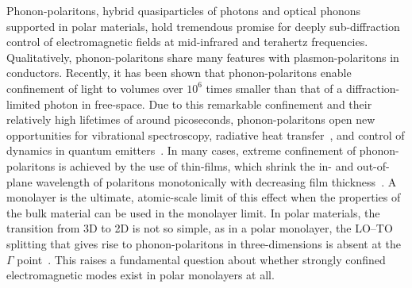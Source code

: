 \documentclass[aps,prb,twocolumn,
	           groupedaddress,superscriptaddress,
               amsfonts,amssymb,amsmath,floatfix,
	           citeautoscript]{revtex4-1}
\begin{document}
Phonon-polaritons, hybrid quasiparticles of photons and optical phonons supported in polar materials, hold tremendous promise for deeply sub-diffraction control of electromagnetic fields at mid-infrared and terahertz frequencies. Qualitatively, phonon-polaritons share many features with plasmon-polaritons in conductors. Recently, it has been shown that phonon-polaritons enable confinement of light to volumes over $10^6$ times smaller than that of a diffraction-limited photon in free-space\cite{caldwell2013low,xu2014mid,caldwell2014sub,dai2014tunable,tomadin2015accessing,yoxall2015direct,li2015hyperbolic,dai2015subdiffractional,dai2015graphene,caldwell2015low,li2016reversible,Basov:2016,basov2017towards,low2017polaritons,giles2017ultra,li2018infrared,ma2018plane}. Due to this remarkable confinement and their relatively high lifetimes of around picoseconds, phonon-polaritons open new opportunities for vibrational spectroscopy,\cite{autore2018boron} radiative heat transfer~\cite{hillenbrand2002phonon}, and control of dynamics in quantum emitters~\cite{kumar2015tunable,rivera2017making,kurman2018control}. 
In many cases, extreme confinement of phonon-polaritons is achieved by the use of thin-films, which shrink the in- and out-of-plane wavelength of polaritons monotonically with decreasing film thickness~\cite{dai2014tunable,dubrovkin2018ultra}. A monolayer is the ultimate, atomic-scale limit of this effect when the properties of the bulk material can be used in the monolayer limit. In polar materials, the transition from 3D to 2D is not so simple, as in a polar monolayer, the LO--TO splitting that gives rise to phonon-polaritons in three-dimensions is absent at the $\Gamma$ point~\cite{sanchez2002vibrational,mele2002electric,serrano2007vibrational,sohier2017breakdown}. This raises a fundamental question about whether strongly confined electromagnetic modes exist in polar monolayers at all. 
\end{document}
